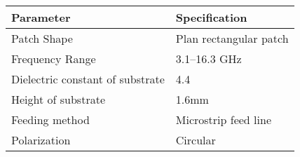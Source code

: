 \documentclass{article}
\begin{document}
	\begin{table}
		\centering
		\begin{tabular}{ |l|l|}
			\hline
                   Parameter & Specification \\ \hline
                   Patch Shape &  Plan rectangular patch \\ \hline
                   Frequency Range &  3.1–16.3 GHz \\ \hline
                   Dielectric constant of substrate & 4.4 \\ \hline
                   Height of substrate &   1.6mm \\ \hline
                   Feeding method &  Microstrip feed line \\ \hline
                   Polarization &  Circular \\ \hline			
		\end{tabular}
	\end{table}
\end{document}

